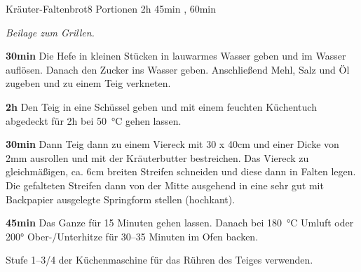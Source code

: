 \documentclass[../recipe-collections/cooking.tex]{subfiles}
\begin{document}
\begin{recipe}{Kräuter-Faltenbrot}{8 Portionen }{2h 45min , 60min }

  \freeform{}\textit{Beilage zum Grillen.}


  \textbf{30min}
  Die Hefe in kleinen Stücken in lauwarmes Wasser geben und im Wasser auflösen.
  Danach den Zucker ins Wasser geben.
  Anschließend Mehl, Salz und Öl zugeben und zu einem Teig verkneten.

  \newstep{}\textbf{2h}
  Den Teig in eine Schüssel geben und mit einem feuchten Küchentuch abgedeckt für 2h bei 50 °C gehen lassen.


  \textbf{30min}
  Dann Teig dann zu einem Viereck mit 30 x 40cm und einer Dicke von 2mm ausrollen und mit der Kräuterbutter bestreichen.
  Das Viereck zu gleichmäßigen, ca. 6cm breiten Streifen schneiden und diese dann in Falten legen.
  Die gefalteten Streifen dann von der Mitte ausgehend in eine sehr gut mit Backpapier ausgelegte Springform stellen (hochkant).

  \newstep{}\textbf{45min}
  Das Ganze für 15 Minuten gehen lassen.
  Danach bei 180 °C Umluft oder 200° Ober-/Unterhitze für 30--35 Minuten im Ofen backen.

  \freeform{}\hrulefill{}

  \freeform{}
  Stufe 1–3/4 der Küchenmaschine für das Rühren des Teiges verwenden.

\end{recipe}
\end{document}
